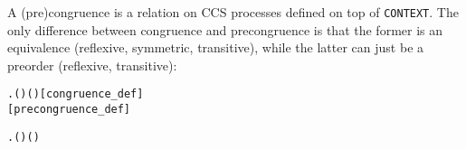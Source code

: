 A (pre)congruence is a relation on CCS processes defined on top of
\texttt{CONTEXT}. The only difference between congruence and
precongruence is that the former  is an equivalence (reflexive,
symmetric, transitive), while the latter can  just be  a preorder (reflexive, transitive):
\begin{alltt}
  \HOLSymConst{\HOLTokenDefEquality{}}
    \HOLSymConst{\HOLTokenConj{}}
  \HOLSymConst{\HOLTokenForall{}}  .   \HOLSymConst{\HOLTokenImp{}}    \HOLSymConst{\HOLTokenImp{}}  ( ) ( )\hfill{[congruence_def]}
\hfill{[precongruence_def]}
\end{alltt}
\vspace{-4ex}
\begin{alltt}
  \HOLSymConst{\HOLTokenDefEquality{}}
    \HOLSymConst{\HOLTokenConj{}}
  \HOLSymConst{\HOLTokenForall{}}  .   \HOLSymConst{\HOLTokenImp{}}    \HOLSymConst{\HOLTokenImp{}}  ( ) ( )
\end{alltt}

  